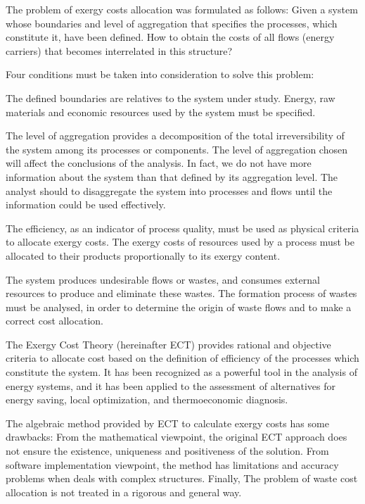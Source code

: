 \documentclass{ecos2018}
\begin{document}
The problem of exergy costs allocation was formulated \cite{Valero1986,ECT93} as follows: Given a system whose boundaries and level of aggregation that specifies the processes, which constitute it, have been defined. How to obtain the costs of all flows (energy carriers) that becomes interrelated in this structure?

Four conditions must be taken into consideration to solve this problem:
\begin{compactenum}[(i)]
	\item The defined boundaries are relatives to the system under study. Energy, raw materials and economic resources used by the system must be specified.
	\item The level of aggregation provides a decomposition of the total irreversibility of the system among its processes or components. The level of aggregation chosen will affect the conclusions of the analysis. In fact, we do not have more information about the system than that defined by its aggregation level. The analyst should to disaggregate the system into processes and flows until the information could be used effectively. 
	\item The efficiency, as an indicator of process quality, must be used as physical criteria to allocate exergy costs. The exergy costs of resources used by a process must be allocated to their products proportionally to its exergy content. 
	\item The system produces undesirable flows or wastes, and consumes external resources to produce and eliminate these wastes. The formation process of wastes must be analysed, in order to determine the origin of waste flows and to make a correct cost allocation. 
\end{compactenum}

The Exergy Cost Theory \cite{ECT93} (hereinafter ECT) provides rational and objective criteria to allocate cost based on the definition of efficiency of the processes which constitute the system. It has been recognized as a powerful tool in the analysis of energy systems, and it has been applied to the assessment of alternatives for energy saving, local optimization, and thermoeconomic diagnosis.

The algebraic method provided by ECT to calculate exergy costs has some drawbacks: From the mathematical viewpoint, the original ECT approach does not ensure the existence, uniqueness and positiveness of the solution. From software implementation viewpoint, the method has limitations and accuracy problems when deals with complex structures. Finally, The problem of waste cost allocation is not treated in a rigorous and general way.
\end{document}
